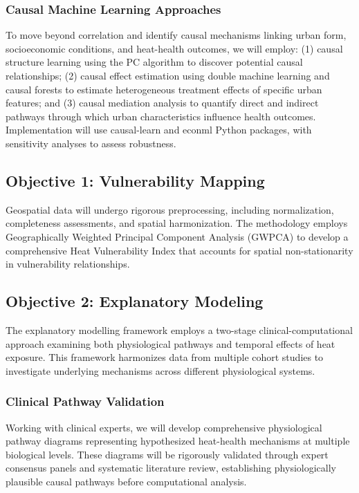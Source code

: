 \subsubsection{Causal Machine Learning Approaches}
To move beyond correlation and identify causal mechanisms linking urban form, socioeconomic conditions, and heat-health outcomes, we will employ: (1) causal structure learning using the PC algorithm to discover potential causal relationships; (2) causal effect estimation using double machine learning and causal forests to estimate heterogeneous treatment effects of specific urban features; and (3) causal mediation analysis to quantify direct and indirect pathways through which urban characteristics influence health outcomes. Implementation will use causal-learn and econml Python packages, with sensitivity analyses to assess robustness.

\subsection{Objective 1: Vulnerability Mapping}
Geospatial data will undergo rigorous preprocessing, including normalization, completeness assessments, and spatial harmonization. The methodology employs Geographically Weighted Principal Component Analysis (GWPCA) \citep{Harris2011, Quispe2023} to develop a comprehensive Heat Vulnerability Index that accounts for spatial non-stationarity in vulnerability relationships.

\subsection{Objective 2: Explanatory Modeling}
The explanatory modelling framework employs a two-stage clinical-computational approach examining both physiological pathways and temporal effects of heat exposure. This framework harmonizes data from multiple cohort studies to investigate underlying mechanisms across different physiological systems.

\subsubsection{Clinical Pathway Validation}
Working with clinical experts, we will develop comprehensive physiological pathway diagrams representing hypothesized heat-health mechanisms at multiple biological levels. These diagrams will be rigorously validated through expert consensus panels and systematic literature review, establishing physiologically plausible causal pathways before computational analysis.

